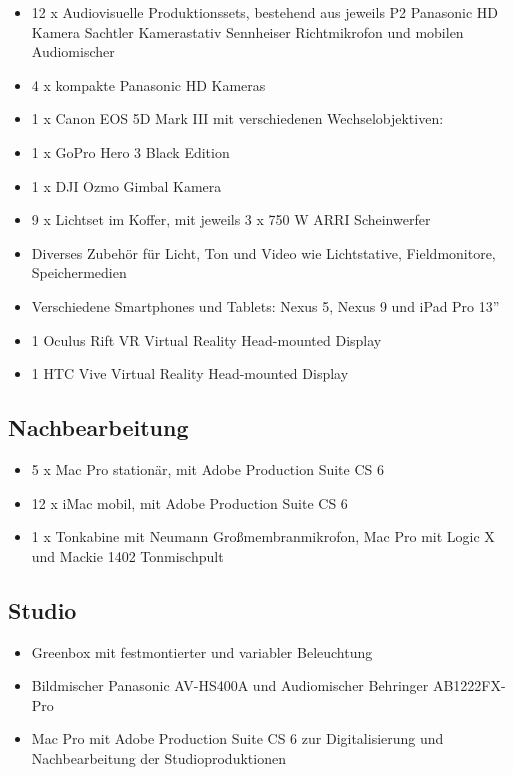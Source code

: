 \begin{itemize}
\tightlist
\item
  12 x Audiovisuelle Produktionssets, bestehend aus jeweils P2 Panasonic
  HD Kamera Sachtler Kamerastativ Sennheiser Richtmikrofon und mobilen
  Audiomischer
\item
  4 x kompakte Panasonic HD Kameras
\item
  1 x Canon EOS 5D Mark III mit verschiedenen Wechselobjektiven:
\item
  1 x GoPro Hero 3 Black Edition
\item
  1 x DJI Ozmo Gimbal Kamera
\item
  9 x Lichtset im Koffer, mit jeweils 3 x 750 W ARRI Scheinwerfer
\item
  Diverses Zubehör für Licht, Ton und Video wie Lichtstative,
  Fieldmonitore, Speichermedien
\item
  Verschiedene Smartphones und Tablets: Nexus 5, Nexus 9 und iPad Pro
  13''
\item
  1 Oculus Rift VR Virtual Reality Head-mounted Display
\item
  1 HTC Vive Virtual Reality Head-mounted Display
\end{itemize}

\subsection{Nachbearbeitung}\label{nachbearbeitung}

\begin{itemize}
\tightlist
\item
  5 x Mac Pro stationär, mit Adobe Production Suite CS 6
\item
  12 x iMac mobil, mit Adobe Production Suite CS 6
\item
  1 x Tonkabine mit Neumann Großmembranmikrofon, Mac Pro mit Logic X und
  Mackie 1402 Tonmischpult
\end{itemize}

\subsection{Studio}\label{studio}

\begin{itemize}
\tightlist
\item
  Greenbox mit festmontierter und variabler Beleuchtung
\item
  Bildmischer Panasonic AV-HS400A und Audiomischer Behringer
  AB1222FX-Pro
\item
  Mac Pro mit Adobe Production Suite CS 6 zur Digitalisierung und
  Nachbearbeitung der Studioproduktionen
\end{itemize}

